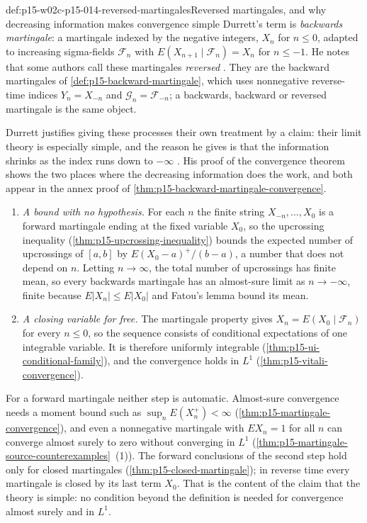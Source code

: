 \begin{hbconvention}{def:p15-w02c-p15-014-reversed-martingales}{Reversed martingales, and why decreasing information makes convergence simple}
Durrett's term is \emph{backwards martingale}: a martingale indexed by
the negative integers, \(X_n\) for \(n\leq0\), adapted to increasing
sigma-fields \(\mathcal F_n\) with \(E(X_{n+1}\mid\mathcal F_n)=X_n\) for
\(n\leq-1\). He notes that some authors call these martingales
\emph{reversed} \cite[sec.~4.7, p.~249]{DurrettPTEAuthor2019}. They are
the backward martingales of \cref{def:p15-backward-martingale}, which
uses nonnegative reverse-time indices \(Y_n=X_{-n}\) and
\(\mathcal G_n=\mathcal F_{-n}\); a backwards, backward or reversed
martingale is the same object.

Durrett justifies giving these processes their own treatment by a claim:
their limit theory is especially simple, and the reason he gives is that
the information shrinks as the index runs down to \(-\infty\)
\cite[sec.~4.7, p.~249]{DurrettPTEAuthor2019}. His proof of the
convergence theorem \cite[Theorem~4.7.1, pp.~249--250]{DurrettPTEAuthor2019}
shows the two places where the decreasing information does the work,
and both appear in the annex proof of
\cref{thm:p15-backward-martingale-convergence}.
\begin{enumerate}
\item \emph{A bound with no hypothesis.} For each \(n\) the finite
      string \(X_{-n},\ldots,X_0\) is a forward martingale ending at the
      fixed variable \(X_0\), so the upcrossing inequality
      (\cref{thm:p15-upcrossing-inequality}) bounds the expected number of
      upcrossings of \([a,b]\) by \(E(X_0-a)^+/(b-a)\), a number that
      does not depend on \(n\). Letting \(n\to\infty\), the total number
      of upcrossings has finite mean, so every backwards martingale has
      an almost-sure limit as \(n\to-\infty\), finite because
      \(E|X_n|\leq E|X_0|\) and Fatou's lemma bound its mean.
\item \emph{A closing variable for free.} The martingale property gives
      \(X_n=E(X_0\mid\mathcal F_n)\) for every \(n\leq0\), so the
      sequence consists of conditional expectations of one integrable
      variable. It is therefore uniformly integrable
      (\cref{thm:p15-ui-conditional-family}), and the convergence holds
      in \(L^1\) (\cref{thm:p15-vitali-convergence}).
\end{enumerate}
For a forward martingale neither step is automatic. Almost-sure
convergence needs a moment bound such as
\(\sup_nE(X_n^+)<\infty\) (\cref{thm:p15-martingale-convergence}), and
even a nonnegative martingale with \(EX_n=1\) for all \(n\) can converge
almost surely to zero without converging in \(L^1\)
(\cref{thm:p15-martingale-source-counterexamples}~(1)). The forward
conclusions of the second step hold only for closed martingales
(\cref{thm:p15-closed-martingale}); in reverse time every martingale is
closed by its last term \(X_0\). That is the content of the claim that
the theory is simple: no condition beyond the definition is needed for
convergence almost surely and in \(L^1\).
\end{hbconvention}


